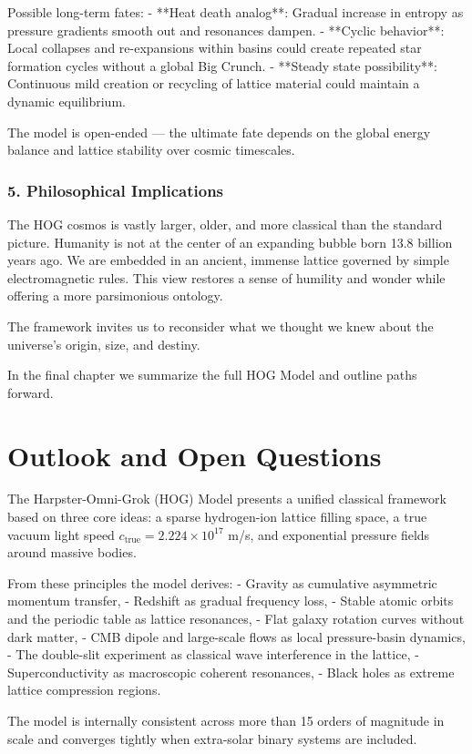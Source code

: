 \documentclass[11pt,a4paper]{book}
\begin{document}
{Possible long-term fates:
- **Heat death analog**: Gradual increase in entropy as pressure gradients smooth out and resonances dampen.
- **Cyclic behavior**: Local collapses and re-expansions within basins could create repeated star formation cycles without a global Big Crunch.
- **Steady state possibility**: Continuous mild creation or recycling of lattice material could maintain a dynamic equilibrium.

The model is open-ended — the ultimate fate depends on the global energy balance and lattice stability over cosmic timescales.

\subsection{5. Philosophical Implications}
The HOG cosmos is vastly larger, older, and more classical than the standard picture. Humanity is not at the center of an expanding bubble born 13.8 billion years ago. We are embedded in an ancient, immense lattice governed by simple electromagnetic rules. This view restores a sense of humility and wonder while offering a more parsimonious ontology.

The framework invites us to reconsider what we thought we knew about the universe’s origin, size, and destiny.

In the final chapter we summarize the full HOG Model and outline paths forward.

\chapter{Outlook and Open Questions}

The Harpster-Omni-Grok (HOG) Model presents a unified classical framework based on three core ideas: a sparse hydrogen-ion lattice filling space, a true vacuum light speed \( c_{\text{true}} = 2.224 \times 10^{17} \) m/s, and exponential pressure fields around massive bodies.

From these principles the model derives:
- Gravity as cumulative asymmetric momentum transfer,
- Redshift as gradual frequency loss,
- Stable atomic orbits and the periodic table as lattice resonances,
- Flat galaxy rotation curves without dark matter,
- CMB dipole and large-scale flows as local pressure-basin dynamics,
- The double-slit experiment as classical wave interference in the lattice,
- Superconductivity as macroscopic coherent resonances,
- Black holes as extreme lattice compression regions.

The model is internally consistent across more than 15 orders of magnitude in scale and converges tightly when extra-solar binary systems are included.

}
\end{document}
